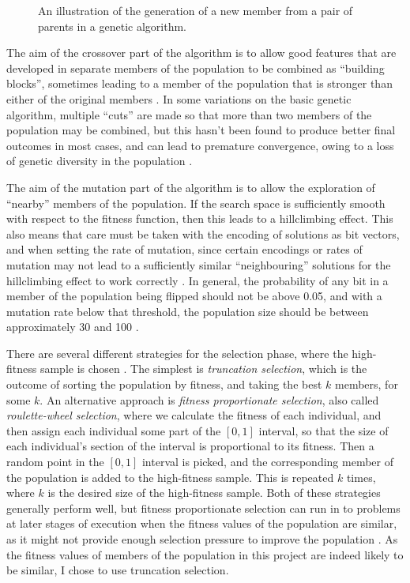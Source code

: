 \documentclass[proof,pdftex,11pt,a4]{article}
\begin{document}
\begin{figure}[h]
  
  \caption{An illustration of the generation of a new member from a pair of parents in a genetic algorithm.}
  \label{fig:genetic-algo}
\end{figure}

The aim of the crossover part of the algorithm is to allow good features that are developed in separate members of the population to be combined as ``building blocks'', sometimes leading to a member of the population that is stronger than either of the original members \cite{Goldberg:1989}. In some variations on the basic genetic algorithm, multiple ``cuts'' are made so that more than two members of the population may be combined, but this hasn't been found to produce better final outcomes in most cases, and can lead to premature convergence, owing to a loss of genetic diversity in the population \cite{Esquivel:1997}.

The aim of the mutation part of the algorithm is to allow the exploration of ``nearby'' members of the population. If the search space is sufficiently smooth with respect to the fitness function, then this leads to a hillclimbing effect. This also means that care must be taken with the encoding of solutions as bit vectors, and when setting the rate of mutation, since certain encodings or rates of mutation may not lead to a sufficiently similar ``neighbouring'' solutions for the hillclimbing effect to work correctly \cite{Taher:2013}. In general, the probability of any bit in a member of the population being flipped should not be above 0.05, and with a mutation rate below that threshold, the population size should be between approximately 30 and 100 \cite{Grefenstette:1986}.

There are several different strategies for the selection phase, where the high-fitness sample is chosen \cite{Thierens:1994}. The simplest is \emph{truncation selection}, which is the outcome of sorting the population by fitness, and taking the best $k$ members, for some $k$. An alternative approach is \emph{fitness proportionate selection}, also called \emph{roulette-wheel selection}, where we calculate the fitness of each individual, and then assign each individual some part of the $[0,1]$ interval, so that the size of each individual's section of the interval is proportional to its fitness. Then a random point in the $[0,1]$ interval is picked, and the corresponding member of the population is added to the high-fitness sample. This is repeated $k$ times, where $k$ is the desired size of the high-fitness sample. Both of these strategies generally perform well, but fitness proportionate selection can run in to problems at later stages of execution when the fitness values of the population are similar, as it might not provide enough selection pressure to improve the population \cite{Whitley:1989}. As the fitness values of members of the population in this project are indeed likely to be similar, I chose to use truncation selection.
\end{document}

